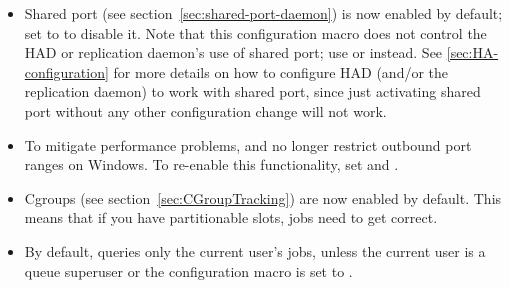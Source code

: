 \begin{itemize}

\item Shared port (see section~\ref{sec:shared-port-daemon}) is now
enabled by default; set  to  to
disable it.  Note that this configuration macro does not control the HAD or
replication daemon's use of shared port; use 
or  instead.  See
\ref{sec:HA-configuration} for more details on how to configure HAD (and/or
the replication daemon) to work with shared port, since just activating
shared port without any other configuration change will not work.

\item To mitigate performance problems,  and
 no longer restrict outbound port ranges on Windows.  To
re-enable this functionality, set  and
.  

\item Cgroups (see section~\ref{sec:CGroupTracking}) are now enabled by default.  This means that if you
have partitionable slots, jobs need to get 
correct.

\item By default,  queries only the current user's jobs,
unless the current user is a queue superuser or the
 configuration macro is set to
.


\end{itemize}

